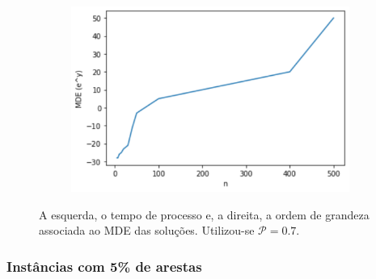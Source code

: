 \documentclass[a4paper,12pt]{report}
\begin{document}
\begin{figure}[H]
\begin{center}
\begin{minipage}{0.45 \linewidth}
				\begin{figure}[H]
					\begin{center}
						\includegraphics[width=1\linewidth]{figures/mdeTriPro1.png}
					\end{center}
					\label{fig:mdeTri}
				\end{figure}
			\end{minipage}
		\end{center}
		\caption{A esquerda, o tempo de processo e, a direita, a ordem de grandeza associada ao MDE das soluções. Utilizou-se $\mathcal{P} = 0.7$.}
		\label{fig:triPri4}
	\end{figure}
	
	\subsubsection*{Instâncias com 5\% de arestas}
	
\end{document}
